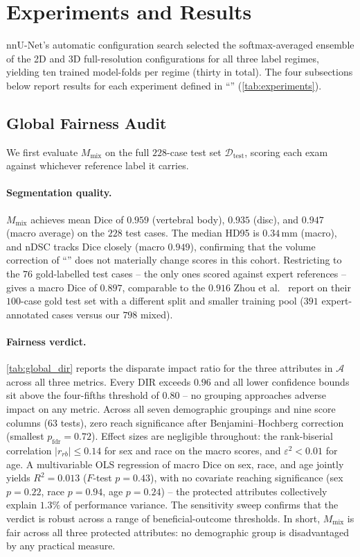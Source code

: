\section{Experiments and Results}

nnU-Net's automatic configuration search selected the softmax-averaged ensemble of
the 2D and 3D full-resolution configurations for all three label regimes, yielding
ten trained model-folds per regime (thirty in total). The four subsections below
report results for each experiment defined in ``''
(\autoref{tab:experiments}).

\subsection{Global Fairness Audit}
\label{sec:global}

We first evaluate $M_{\mathrm{mix}}$ on the full $228$-case test set
$\mathcal{D}_{\mathrm{test}}$, scoring each exam against whichever reference label
it carries.

\paragraph{Segmentation quality.}
$M_{\mathrm{mix}}$ achieves mean Dice of $0.959$ (vertebral body), $0.935$ (disc),
and $0.947$ (macro average) on the $228$ test cases. The median HD95 is
$0.34$\,mm (macro), and nDSC tracks Dice closely (macro $0.949$), confirming that
the volume correction of ``'' does not materially change
scores in this cohort. Restricting to the $76$ gold-labelled test cases -- the only
ones scored against expert references -- gives a macro Dice of $0.897$, comparable
to the $0.916$ Zhou et al.~\cite{zhou2025cspineseg} report on their $100$-case gold
test set with a different split and smaller training pool ($391$ expert-annotated
cases versus our $798$ mixed).

\paragraph{Fairness verdict.}
\autoref{tab:global_dir} reports the disparate impact ratio for the three attributes
in $\mathcal{A}$ across all three metrics.
Every DIR exceeds $0.96$ and all lower confidence bounds sit above the four-fifths
threshold of $0.80$ -- no grouping approaches adverse impact on any metric. Across
all seven demographic groupings and nine score columns ($63$ tests), zero reach
significance after Benjamini--Hochberg correction (smallest
$p_{\mathrm{fdr}} = 0.72$). Effect sizes are negligible throughout: the
rank-biserial correlation $|r_{rb}| \le 0.14$ for sex and race on the macro
scores, and $\varepsilon^2 < 0.01$ for age. A multivariable OLS regression of macro Dice on
sex, race, and age jointly yields $R^2 = 0.013$ ($F$-test $p = 0.43$), with no
covariate reaching significance (sex $p = 0.22$, race $p = 0.94$, age $p = 0.24$)
-- the protected attributes collectively explain $1.3\%$ of performance variance.
The sensitivity sweep confirms that the verdict is robust across a range of
beneficial-outcome thresholds. In short, $M_{\mathrm{mix}}$ is fair across
all three protected attributes: no demographic group is disadvantaged by any
practical measure.

